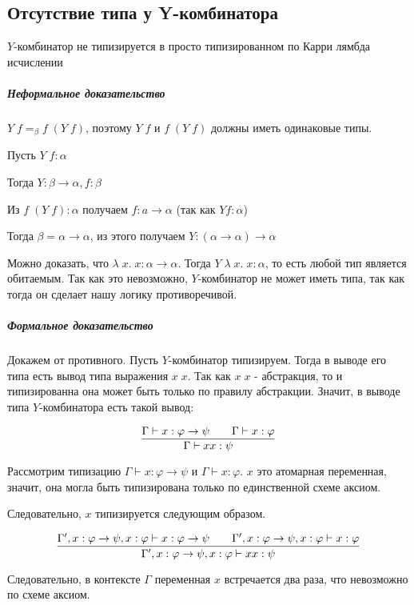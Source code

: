 \subsection{Отсутствие типа у Y-комбинатора}

\begin{theorem}
	$Y$-комбинатор не типизируется в просто типизированном по Карри лямбда исчислении
\end{theorem}

\subparagraph{Неформальное доказательство}

$Y \; f =_{\beta} f \; (Y \; f)$, поэтому $Y \; f$ и $f \; (Y \; f)$ должны иметь одинаковые типы.

Пусть $Y \; f : \alpha$

Тогда $Y : \beta \rightarrow \alpha, f : \beta$

Из $f \; (Y \; f) : \alpha$ получаем $f: a \rightarrow \alpha$ (так как $Y f : \alpha$)

Тогда $\beta = \alpha \rightarrow \alpha$, из этого получаем $Y : (\alpha \rightarrow \alpha) \rightarrow \alpha$

Можно доказать, что $\lambda \; x. \; x : \alpha \rightarrow \alpha$. Тогда $Y \; \lambda \; x. \; x : \alpha$, то есть любой тип является обитаемым. Так как это невозможно, $Y$-комбинатор не может иметь типа, так как тогда он сделает нашу логику противоречивой.

\subparagraph{Формальное доказательство}

Докажем от противного. Пусть $Y$-комбинатор типизируем. Тогда в выводе его типа есть вывод типа выражения $x \; x$. Так как $x \; x$ - абстракция, то и типизированна она может быть только по правилу абстракции. Значит, в выводе типа $Y$-комбинатора есть такой вывод:

$$\infer{\Gamma \vdash x x: \psi}{\Gamma \vdash x: \varphi \rightarrow \psi && \Gamma \vdash x: \varphi }$$

Рассмотрим типизацию $\Gamma \vdash x: \varphi \rightarrow \psi$ и $\Gamma \vdash x: \varphi$. $x$ это атомарная переменная, значит, она могла быть типизирована только по единственной схеме аксиом. 

Следовательно, $x$ типизируется следующим образом.

$$\infer{\Gamma', x: \varphi \rightarrow \psi, x: \varphi \vdash x x: \psi}{\Gamma', x: \varphi \rightarrow \psi, x: \varphi \vdash x: \varphi \rightarrow \psi && \Gamma', x: \varphi \rightarrow \psi, x: \varphi \vdash x: \varphi }$$

Следовательно, в контексте $\Gamma$ переменная $x$ встречается два раза, что невозможно по схеме аксиом.


